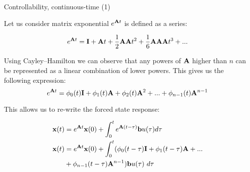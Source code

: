 \documentclass{beamer}
\begin{document}
\begin{frame}{Controllability, continuous-time (1)}
	\begin{flushleft}
		
		Let us consider matrix exponential $e^{\mathbf{A}t}$ is defined as a series:
		
		\begin{equation}
			e^{\mathbf{A}t} = \mathbf{I}+\mathbf{A}t+\frac{1}{2} \mathbf{A}\mathbf{A}t^2
			+\frac{1}{6} \mathbf{A}\mathbf{A}\mathbf{A}t^3 + ...
		\end{equation}
	
		Using Cayley–Hamilton we can observe that any powers of $\mathbf{A}$ higher than $n$ can be represented as a linear combination of lower powers. This gives us the following expression:
		\begin{equation}
			e^{\mathbf{A}t} = \phi_0(t)\mathbf{I}+\phi_1(t)\mathbf{A}+\phi_2(t) \mathbf{A}^2 + ...
 + \phi_{n-1}(t) \mathbf{A}^{n-1}
		\end{equation}
		
		This allows us to re-write the forced state response:
		
		\begin{align*}
			\mathbf{x}(t) &= e^{\mathbf{A}t}  \mathbf{x}(0) + 
			\int_{0}^{t} e^{\mathbf{A}(t-\tau)} \mathbf{b}  u(\tau) d\tau
			\\
			\mathbf{x}(t) &= e^{\mathbf{A}t}  \mathbf{x}(0) + 
			\int_{0}^{t} 
			( \phi_0(t-\tau)\mathbf{I}+\phi_1(t-\tau)\mathbf{A}+ ... 
			\\
			&+ \phi_{n-1}(t-\tau) \mathbf{A}^{n-1} ) 
			\mathbf{b}  u(\tau) \ d\tau
		\end{align*}
		
		
	\end{flushleft}
\end{frame}
\end{document}

